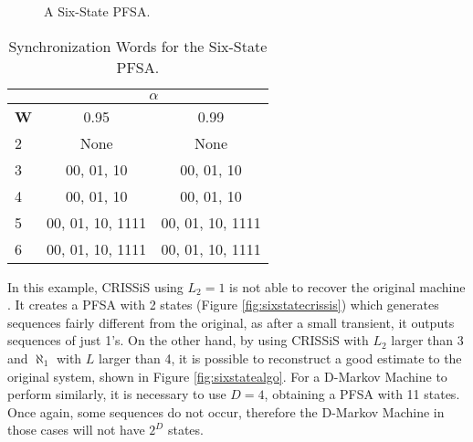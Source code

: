 {\begin{figure}
\centering
{}
\caption{A Six-State PFSA.\label{fig:sixstate}}
\end{figure}

\begin{table}
\centering
\caption{Synchronization Words for the Six-State PFSA. \label{tab:tswsynch}}
\begin{tabular}{|l|c|c|}
\hline
 & \multicolumn{2}{c|}{\textbf{$\alpha$}}\\
 \hline
\textbf{W} & 0.95 & 0.99 \\
\hline
2 & None & None \\ 
3 & 00, 01, 10  & 00, 01, 10 \\ 
4 & 00, 01, 10  & 00, 01, 10 \\ 
5 & 00, 01, 10, 1111  & 00, 01, 10, 1111 \\
6 & 00, 01, 10, 1111  & 00, 01, 10, 1111 \\
 \hline
\end{tabular}
\end{table}

In this example, CRISSiS using $L_2 = 1$ is not able to recover the original machine . It creates a PFSA with 2 states (Figure \ref{fig:sixstatecrissis}) which generates sequences fairly different from the original, as after a small transient, it outputs sequences of just 1's. On the other hand, by using CRISSiS with $L_2$ larger than 3 and $\aleph_1$ with $L$ larger than 4, it is possible to reconstruct a good estimate to the original system, shown in Figure \ref{fig:sixstatealgo}. For a D-Markov Machine to perform similarly, it is necessary to use $D=4$, obtaining a PFSA with 11 states. Once again, some sequences do not occur, therefore the D-Markov Machine in those cases will not have $2^D$ states.

}
